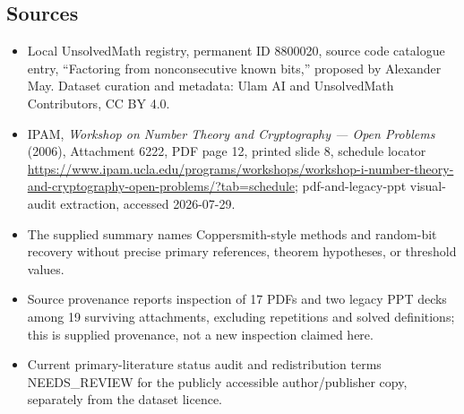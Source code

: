 \documentclass[11pt]{article}
\begin{document}
\subsection{Sources}
\begin{itemize}
\item Local UnsolvedMath registry, permanent ID 8800020, source code catalogue entry, ``Factoring from nonconsecutive known bits,'' proposed by Alexander May. Dataset curation and metadata: Ulam AI and UnsolvedMath Contributors, CC BY 4.0.
\item IPAM, \emph{Workshop on Number Theory and Cryptography --- Open Problems} (2006), Attachment 6222, PDF page 12, printed slide 8, schedule locator \url{https://www.ipam.ucla.edu/programs/workshops/workshop-i-number-theory-and-cryptography-open-problems/?tab=schedule}; pdf-and-legacy-ppt visual-audit extraction, accessed 2026-07-29.
\item The supplied summary names Coppersmith-style methods and random-bit recovery without precise primary references, theorem hypotheses, or threshold values.
\item Source provenance reports inspection of 17 PDFs and two legacy PPT decks among 19 surviving attachments, excluding repetitions and solved definitions; this is supplied provenance, not a new inspection claimed here.
\item Current primary-literature status audit and redistribution terms NEEDS\_REVIEW for the publicly accessible author/publisher copy, separately from the dataset licence.
\end{itemize}
\end{document}
